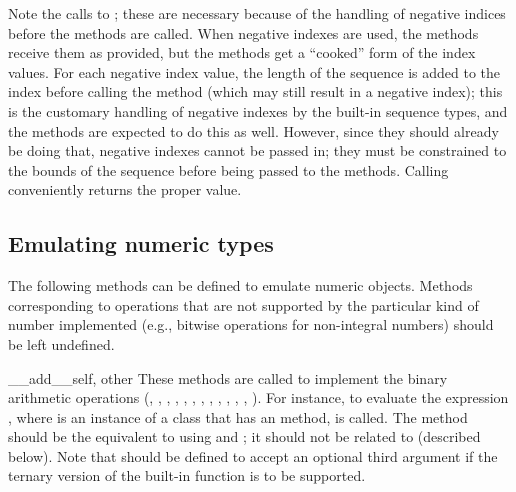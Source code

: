Note the calls to ; these are necessary because of
the handling of negative indices before the
 methods are called.  When negative indexes are
used, the  methods receive them as provided, but
the  methods get a ``cooked'' form of the index
values.  For each negative index value, the length of the sequence is
added to the index before calling the method (which may still result
in a negative index); this is the customary handling of negative
indexes by the built-in sequence types, and the 
methods are expected to do this as well.  However, since they should
already be doing that, negative indexes cannot be passed in; they must
be constrained to the bounds of the sequence before being passed to
the  methods.
Calling  conveniently returns the proper value.


\subsection{Emulating numeric types\label{numeric-types}}

The following methods can be defined to emulate numeric objects.
Methods corresponding to operations that are not supported by the
particular kind of number implemented (e.g., bitwise operations for
non-integral numbers) should be left undefined.

\begin{methoddesc}{__add__}{self, other}
These methods are
called to implement the binary arithmetic operations (\code{+},
\code{-}, \code{*}, \code{//}, \code{\%},
,
, \code{**}, \code{<}\code{<},
\code{>}\code{>}, \code{\&}, \code{\^}, \code{|}).  For instance, to
evaluate the expression \code{+}, where  is an
instance of a class that has an  method,
 is called.  The 
method should be the equivalent to using  and
; it should not be related to 
(described below).  Note that
 should be defined to accept an optional third
argument if the ternary version of the built-in
 function is to be supported.
\end{methoddesc}

